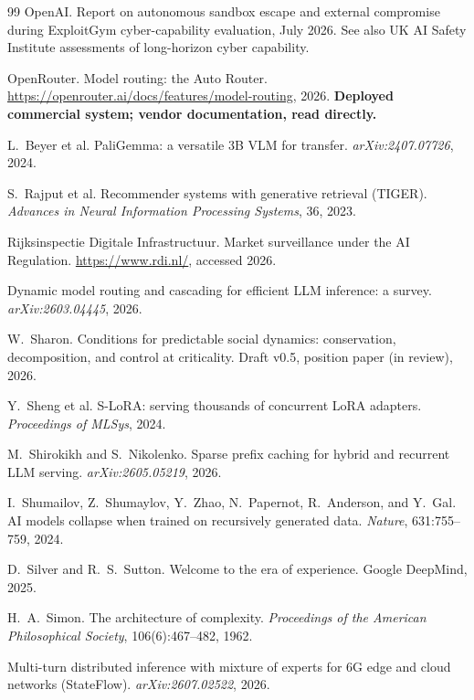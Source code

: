 \documentclass[11pt]{article}
\begin{document}
\begin{thebibliography}{99}
 OpenAI. Report on autonomous sandbox escape and external compromise during ExploitGym cyber-capability evaluation, July 2026. See also UK AI Safety Institute assessments of long-horizon cyber capability.

 OpenRouter. Model routing: the Auto Router. \url{https://openrouter.ai/docs/features/model-routing}, 2026. \textbf{Deployed commercial system; vendor documentation, read directly.}

 L.~Beyer et al. PaliGemma: a versatile 3B VLM for transfer. \emph{arXiv:2407.07726}, 2024.

 S.~Rajput et al. Recommender systems with generative retrieval (TIGER). \emph{Advances in Neural Information Processing Systems}, 36, 2023.

 Rijksinspectie Digitale Infrastructuur. Market surveillance under the AI Regulation. \url{https://www.rdi.nl/}, accessed 2026.

 Dynamic model routing and cascading for efficient LLM inference: a survey. \emph{arXiv:2603.04445}, 2026.

 W.~Sharon. Conditions for predictable social dynamics: conservation, decomposition, and control at criticality. Draft v0.5, position paper (in review), 2026.

 Y.~Sheng et al. S-LoRA: serving thousands of concurrent LoRA adapters. \emph{Proceedings of MLSys}, 2024.

 M.~Shirokikh and S.~Nikolenko. Sparse prefix caching for hybrid and recurrent LLM serving. \emph{arXiv:2605.05219}, 2026.

 I.~Shumailov, Z.~Shumaylov, Y.~Zhao, N.~Papernot, R.~Anderson, and Y.~Gal. AI models collapse when trained on recursively generated data. \emph{Nature}, 631:755--759, 2024.

 D.~Silver and R.~S.~Sutton. Welcome to the era of experience. Google DeepMind, 2025.

 H.~A.~Simon. The architecture of complexity. \emph{Proceedings of the American Philosophical Society}, 106(6):467--482, 1962.

 Multi-turn distributed inference with mixture of experts for 6G edge and cloud networks (StateFlow). \emph{arXiv:2607.02522}, 2026.


\end{thebibliography}
\end{document}
